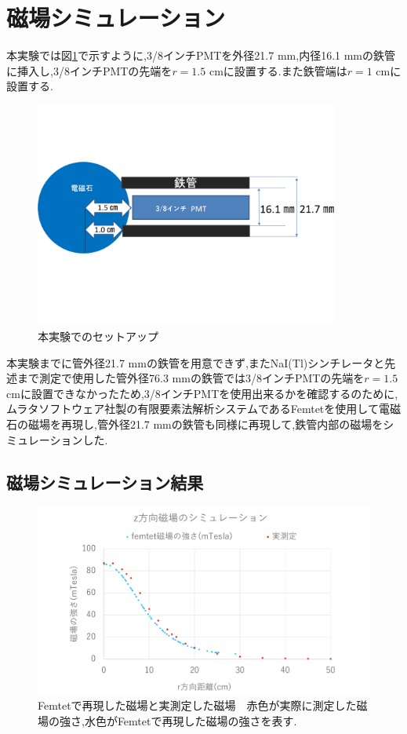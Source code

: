 \section{磁場シミュレーション}
本実験では図\ref{honjikken1}で示すように,3/8インチPMTを外径21.7 mm,内径16.1 mmの鉄管に挿入し,3/8インチPMTの先端を$r=1.5$ cmに設置する.また鉄管端は$r=1$ cmに設置する.

\begin{figure}[tbp]
	\centering
		\includegraphics[width=10cm]{fig/iguchi/honjikken1.pdf}
	\caption{本実験でのセットアップ}
	\label{honjikken1}
\end{figure}

本実験までに管外径21.7 mmの鉄管を用意できず,またNaI(Tl)シンチレータと先述まで測定で使用した管外径76.3 mmの鉄管では3/8インチPMTの先端を$r=1.5$ cmに設置できなかったため,3/8インチPMTを使用出来るかを確認するのために,ムラタソフトウェア社製の有限要素法解析システムであるFemtetを使用して電磁石の磁場を再現し,管外径21.7 mmの鉄管も同様に再現して,鉄管内部の磁場をシミュレーションした.

\subsection{磁場シミュレーション結果}
\begin{figure}[tbp]
	\centering
		\includegraphics[width=16cm]{fig/iguchi/magnetgraph2.pdf}
	\caption{Femtetで再現した磁場と実測定した磁場\newline　赤色が実際に測定した磁場の強さ,水色がFemtetで再現した磁場の強さを表す.}
	\label{magnetgraph2}
\end{figure}

